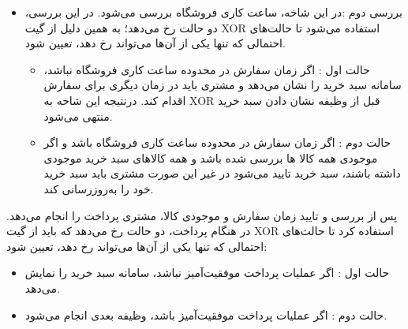 \documentclass[14pt]{article}
\begin{document}
\begin{flushright}
\begin{itemize}
\item بررسی دوم :در این شاخه، ساعت کاری فروشگاه بررسی می‌شود. در این بررسی، دو حالت رخ می‌دهد؛ به همین دلیل از گیت XOR  استفاده می‌شود تا حالت‌های احتمالی که تنها یکی از آن‌ها می‌تواند رخ دهد، تعیین شود.\\
\begin{flushright}
\begin{itemize}
\item حالت اول : اگر زمان سفارش در محدوده ساعت کاری فروشگاه نباشد، سامانه سبد خرید را نشان می‌دهد و مشتری باید در زمان دیگری برای سفارش اقدام کند. درنتیجه این شاخه به XOR قبل از وظیفه نشان دادن سبد خرید منتهی می‌شود.\\
\item حالت دوم : اگر زمان سفارش در محدوده ساعت کاری فروشگاه باشد و اگر موجودی همه کالا ها بررسی شده باشد و همه کالاهای سبد خرید موجودی داشته باشند، سبد خرید تایید می‌شود در غیر این صورت مشتری باید سبد خرید خود را به‌روزرسانی کند.\\
\end{itemize}
\end{flushright}
\end{itemize}
\end{flushright}
پس از بررسی و تایید زمان سفارش و موجودی کالا، مشتری پرداخت را انجام می‌دهد. در هنگام پرداخت، دو حالت رخ می‌دهد که باید از گیت XOR استفاده کرد تا حالت‌های احتمالی که تنها یکی از آن‌ها می‌تواند رخ دهد، تعیین شود:\\
\begin{flushright}
\begin{itemize}
\item حالت اول : اگر عملیات پرداخت موفقیت‌آمیز نباشد، سامانه سبد خرید را نمایش می‌دهد.\\
\item حالت دوم : اگر عملیات پرداخت موفقیت‌آمیز باشد، وظیفه بعدی انجام می‌شود.\\

\end{itemize}
\end{flushright}
\end{document}
